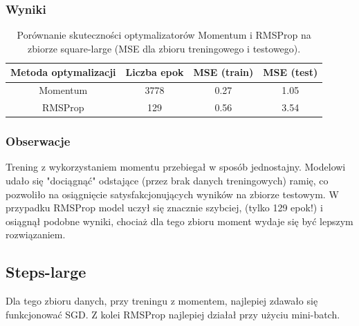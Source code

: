 \documentclass{article}
\begin{document}
\subsubsection*{Wyniki}
\begin{table}[H]
    \centering
    \begin{tabular}{|c|c|c|c|}
        \hline
        Metoda optymalizacji & Liczba epok & MSE (train) & MSE (test) \\
        \hline
        Momentum & 3778 & 0.27 & 1.05 \\
        RMSProp & 129 & 0.56 & 3.54 \\
        \hline
    \end{tabular}
    \caption{Porównanie skuteczności optymalizatorów Momentum i RMSProp na zbiorze square-large (MSE dla zbioru treningowego i testowego).}
\end{table}

\subsubsection*{Obserwacje}
Trening z wykorzystaniem momentu przebiegał w sposób jednostajny. Modelowi udało się "dociągnąć" odstające (przez brak danych treningowych) ramię, co pozwoliło na osiągnięcie satysfakcjonujących wyników na zbiorze testowym. W przypadku RMSProp model uczył się znacznie szybciej, (tylko 129 epok!) i osiągnął podobne wyniki, chociaż dla tego zbioru moment wydaje się być lepszym rozwiązaniem. 

\subsection*{Steps-large}

Dla tego zbioru danych, przy treningu z momentem, najlepiej zdawało się funkcjonować SGD. Z kolei RMSProp najlepiej działał przy użyciu mini-batch.
\end{document}
